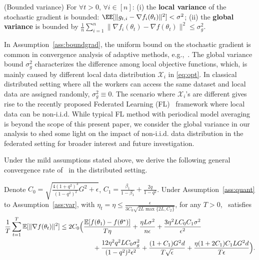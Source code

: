 \documentclass[11pt]{article}
\begin{document}
\begin{assumption}\label{ass:var}(Bounded variance)
For $\forall t >0$, $\forall i \in [n]$: (i) the \textbf{local variance} of the stochastic gradient is bounded: $\EE[\|g_{t,i} - \nabla f_i(\theta_t)\|^2] < \sigma^2$; (ii) the \textbf{global variance} is bounded by $\frac{1}{n}\sum_{i=1}^n\|\nabla f_i(\theta_t)-\nabla f(\theta_t)\|^2\leq \sigma_g^2$.
\end{assumption}

In Assumption~\ref{ass:boundgrad}, the uniform bound on the stochastic gradient is common in convergence analysis of adaptive methods, e.g.,~\cite{reddi2019convergence,Arxiv:Zhou_18,Proc:Chen_ICLR19}. The global variance bound $\sigma_g^2$ characterizes the difference among local objective functions, which, is mainly caused by different local data distribution $\mathcal X_i$ in \eqref{eq:opt}. In classical distributed setting where all the workers can access the same dataset and local data are assigned randomly, $\sigma_g^2\equiv 0$. The scenario where $\mathcal X_i$'s are different gives rise to the recently proposed Federated Learning (FL)~\cite{mcmahan2017communication} framework where local data can be non-i.i.d. While typical FL method with periodical model averaging is beyond the scope of this present paper, we consider the global variance in our analysis to shed some light on the impact of non-i.i.d. data distribution in the federated setting for broader interest and future investigation.


Under the mild assumptions stated above, we derive the following general convergence rate of \algo\ in the distributed setting.

\begin{Theorem}  \label{theo:rate}
Denote $C_0=\sqrt{\frac{4(1+q^2)^3}{(1-q^2)^2}G^2+\epsilon}$, $C_1=\frac{\beta_1}{1-\beta_1}+\frac{2q}{1-q^2}$. Under Assumption~\ref{ass:quant} to Assumption~\ref{ass:var}, with $\eta_t=\eta\leq \frac{\epsilon}{3C_0\sqrt{2L \max\{2L,C_2\}}}$, for any $T >0$, \algo\ satisfies
\begin{align*}
    \frac{1}{T}\sum_{t=1}^T \mathbb E[\|\nabla f(\theta_t)\|^2]
    &\leq 2C_0\Big(\frac{\mathbb E[f(\theta_1)-f(\theta^*)]}{T\eta}+\frac{\eta L \sigma^2}{n\epsilon}+\frac{3\eta^2 LC_0C_1\sigma^2}{\epsilon^2}  \\
    &\hspace{0.7in} + \frac{12\eta^2q^2LC_0\sigma_g^2}{(1-q^2)^2\epsilon^2}+\frac{ (1+C_1)G^2d}{T\sqrt\epsilon}+\frac{\eta (1+2C_1)C_1LG^2d}{T\epsilon} \Big).
\end{align*}
\end{Theorem}
\end{document}
